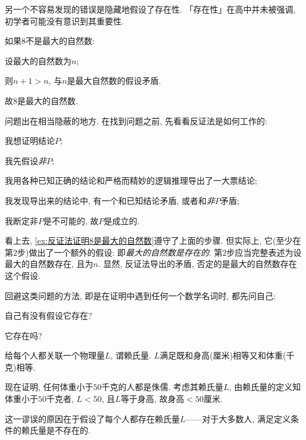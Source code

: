 \documentclass[hidelinks]{ctexart}
\begin{document}
另一个不容易发现的错误是隐藏地假设了存在性. 「存在性」在高中并未被强调, 初学者可能没有意识到其重要性.
\begin{sample}
    \begin{ex}
        \label{ex:反证法证明8是最大的自然数}
        \quad
        \begin{cenum}
            \item 如果$8$不是最大的自然数:
            \item 设最大的自然数为$n$;
            \item 则$n+1>n$, 与$n$是最大自然数的假设矛盾.
            \item 故$8$是最大的自然数.
        \end{cenum}
    \end{ex}
\end{sample}
问题出在相当隐蔽的地方. 在找到问题之前, 先看看反证法是如何工作的:
\begin{cenum}
    \item 我想证明结论$P$;
    \item 我先假设\emph{非$P$};
    \item 我用各种已知正确的结论和严格而精妙的逻辑推理导出了一大票结论;
    \item 我发现导出来的结论中, 有一个和已知结论矛盾, 或者和\emph{非$P$}矛盾;
    \item 我断定非$P$是不可能的, 故$P$是成立的.
\end{cenum}
看上去, \cref{ex:反证法证明8是最大的自然数}遵守了上面的步骤. 但实际上, 它(至少在第$2$步)做出了一个额外的假设: 即\emph{最大的自然数是存在的}. 第$2$步应当完整表述为{\color{red}设最大的自然数存在, 且为$n$}. 显然, 反证法导出的矛盾, 否定的是{\color{red}最大的自然数存在}这个假设.
\par
回避这类问题的方法, 即是在证明中遇到任何一个数学名词时, 都先问自己:
\begin{cenum}
    \item 自己有没有假设它存在?
    \item 它存在吗?
\end{cenum}
\begin{sample}
    \begin{ex}
        \label{ex:赖氏量}
        给每个人都关联一个物理量$L$, 谓赖氏量. $L$满足既和身高(厘米)相等又和体重(千克)相等.
    \end{ex}
    现在证明, 任何体重小于$50$千克的人都是侏儒. 考虑其赖氏量$L$, 由赖氏量的定义知体重小于$50$千克者, $L<50$, 且$L$等于身高, 故身高$<50$厘米.
\end{sample}
这一谬误的原因在于假设了每个人都存在赖氏量$L$——对于大多数人, 满足定义条件的赖氏量是不存在的.
\end{document}
